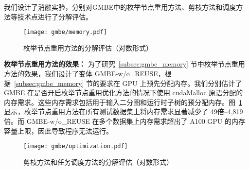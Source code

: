 我们设计了消融实验，分别对GMBE中的枚举节点重用方法、剪枝方法和调度方法等技术点进行了分解评估。

\begin{figure} [H]
	\centering
  \vspace{0.05in}
	\texttt{[image: gmbe/memory.pdf]}	
	\vspace{0.05in}
  \caption{枚举节点重用方法的分解评估（对数形式）}
	\label{fig:gmbe_exp_memory}
\end{figure}



\textbf{枚举节点重用方法的效果：} 为了研究~\ref{subsec:gmbe_memory} 节中枚举节点重用方法的效果，我们设计了变体 GMBE-w/o\_REUSE，根据~\ref{subsec:gmbe_memory} 节的要求在 GPU 上预先分配内存。我们分别估计了 GMBE 在是否开启枚举节点重用优化方法的情况下使用 \textsf{cudaMalloc} 原语分配的内存需求。这些内存需求包括用于输入二分图和运行时子树的预分配内存。图~\ref{fig:gmbe_exp_memory} 显示，枚举节点重用方法在所有测试数据集上将内存需求显著减少了 49倍--4,819倍。而 GMBE-w/o\_REUSE 在多个数据集上内存需求超出了 A100 GPU 的内存容量上限，因此导致程序无法运行。




\begin{figure}[t]
	\centering
  \vspace{0.15in}
	\texttt{[image: gmbe/optimization.pdf]}	
  \caption{剪枝方法和任务调度方法的分解评估（对数形式）}
	\label{fig:gmbe_exp_optimization}
\end{figure}


